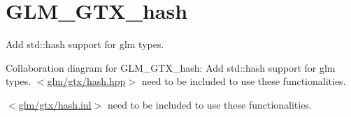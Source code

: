 \hypertarget{group__gtx__hash}{\section{G\-L\-M\-\_\-\-G\-T\-X\-\_\-hash}
\label{group__gtx__hash}
}


Add std\-::hash support for glm types.  


Collaboration diagram for G\-L\-M\-\_\-\-G\-T\-X\-\_\-hash\-:
Add std\-::hash support for glm types. $<$\hyperlink{hash_8hpp}{glm/gtx/hash.\-hpp}$>$ need to be included to use these functionalities.

$<$\hyperlink{hash_8inl}{glm/gtx/hash.\-inl}$>$ need to be included to use these functionalities. 